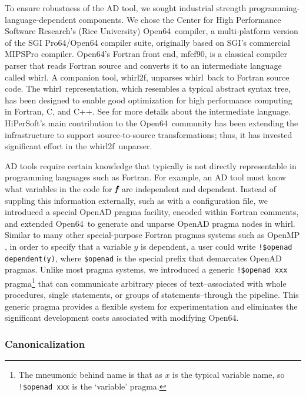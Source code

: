 \documentclass[11pt]{article}
\newcommand{\mfefninety}{mfef90}
\newcommand{\OpenSixtyFour}{Open64}
\newcommand{\whirl}{whirl}
\newcommand{\whirlTof}{whirl2f}
\newcommand{\bmf}{\mbox{\bf\em f}}
\newcommand{\code}[1]{{\small\tt{#1}}}
\begin{document}
To ensure robustness of the AD tool, we sought industrial strength
programming-language-dependent components.  We chose the Center for
High Performance Software Research's (Rice University) \OpenSixtyFour\
compiler, a multi-platform version of the SGI Pro64/Open64 compiler
suite, originally based on SGI's commercial MIPSPro compiler.
\OpenSixtyFour's Fortran front end, \mfefninety, is a classical
compiler parser that reads Fortran source and converts it to an
intermediate language called \whirl.  A companion tool, \whirlTof,
unparses \whirl\ back to Fortran source code.  The \whirl\
representation, which resembles a typical abstract syntax tree, has
been designed to enable good optimization for high performance
computing in Fortran, C, and C++. See \cite{open64Web} for more
details about the intermediate language.  HiPerSoft's main
contribution to the \OpenSixtyFour\ community has been extending the
infrastructure to support source-to-source transformations; thus, it
has invested significant effort in the \whirlTof\ unparser.

AD tools require certain knowledge that typically is not directly
representable in programming languages such as Fortran.  For example,
an AD tool must know what variables in the code for $\bmf$ are
independent and dependent.  Instead of suppling this information
externally, such as with a configuration file, we introduced a special
OpenAD pragma facility, encoded within Fortran comments, and extended
\OpenSixtyFour\ to generate and unparse OpenAD pragma nodes in \whirl.
Similar to many other special-purpose Fortran pragmas systems such as
OpenMP \cite{OpenMP-website}, in order to specify that a variable
$y$ is dependent, a user could write \code{!\$openad dependent(y)},
where \code{\$openad} is the special prefix that demarcates OpenAD
pragmas.  Unlike most pragma systems, we introduced a generic
\code{!\$openad xxx} pragma\footnote{The mneumonic behind name is that
as $x$ is the typical variable name, so \code{!\$openad xxx} is the
`variable' pragma.} that can communicate arbitrary pieces of
text--associated with whole procedures, single statements, or groups
of statements--through the pipeline.  This generic pragma provides a
flexible system for experimentation and eliminates the significant
development costs associated with modifying \OpenSixtyFour.


\subsubsection{Canonicalization}\label{sssec:Canonicalization}
\end{document}
